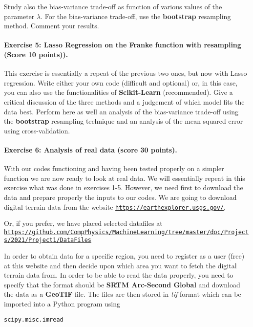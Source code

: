 \documentclass[%
oneside,                 %
final,                   %
10pt]{article}
\begin{document}
Study also the bias-variance trade-off as function of various values of
the parameter $\lambda$. For the bias-variance trade-off, use the \textbf{bootstrap} resampling method. Comment your results. 

\paragraph{Exercise 5: Lasso Regression on the Franke function  with resampling (Score 10 points)).}
This exercise is essentially a repeat of the previous two ones, but now
with Lasso regression. Write either your own code (difficult and optional) or, in this case,
you can also use the functionalities of \textbf{Scikit-Learn} (recommended). 
Give a
critical discussion of the three methods and a judgement of which
model fits the data best.  Perform here as well an analysis of the bias-variance trade-off using the \textbf{bootstrap} resampling technique and an analysis of the mean squared error using cross-validation. 

\paragraph{Exercise 6: Analysis of real data  (score 30 points).}
With our codes functioning and having been tested properly on a
simpler function we are now ready to look at real data. We will
essentially repeat in this exercise what was done in exercises 1-5. However, we
need first to download the data and prepare properly the inputs to our
codes.  We are going to download digital terrain data from the website
\href{{https://earthexplorer.usgs.gov/}}{\nolinkurl{https://earthexplorer.usgs.gov/}},

Or, if you prefer, we have placed selected datafiles at \href{{https://github.com/CompPhysics/MachineLearning/tree/master/doc/Projects/2021/Project1/DataFiles}}{\nolinkurl{https://github.com/CompPhysics/MachineLearning/tree/master/doc/Projects/2021/Project1/DataFiles}}

In order to obtain data for a specific region, you need to register as
a user (free) at this website and then decide upon which area you want
to fetch the digital terrain data from.  In order to be able to read
the data properly, you need to specify that the format should be \textbf{SRTM
Arc-Second Global} and download the data as a \textbf{GeoTIF} file.  The
files are then stored in \emph{tif} format which can be imported into a
Python program using

\begin{verbatim}
scipy.misc.imread
\end{verbatim}
\end{document}
